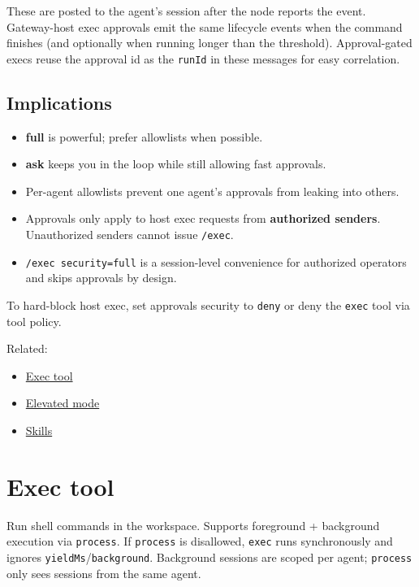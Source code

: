 These are posted to the agent’s session after the node reports the event.
Gateway-host exec approvals emit the same lifecycle events when the command finishes (and optionally when running longer than the threshold).
Approval-gated execs reuse the approval id as the \texttt{runId} in these messages for easy correlation.

\subsection{Implications}


\begin{itemize}
  \item \textbf{full} is powerful; prefer allowlists when possible.
  \item \textbf{ask} keeps you in the loop while still allowing fast approvals.
  \item Per-agent allowlists prevent one agent’s approvals from leaking into others.
  \item Approvals only apply to host exec requests from \textbf{authorized senders}. Unauthorized senders cannot issue \texttt{/exec}.
  \item \texttt{/exec security=full} is a session-level convenience for authorized operators and skips approvals by design.
\end{itemize}

To hard-block host exec, set approvals security to \texttt{deny} or deny the \texttt{exec} tool via tool policy.

Related:

\begin{itemize}
  \item \href{/tools/exec}{Exec tool}
  \item \href{/tools/elevated}{Elevated mode}
  \item \href{/tools/skills}{Skills}
\end{itemize}



\clearpage

\section{Exec tool}


Run shell commands in the workspace. Supports foreground + background execution via \texttt{process}.
If \texttt{process} is disallowed, \texttt{exec} runs synchronously and ignores \texttt{yieldMs}/\texttt{background}.
Background sessions are scoped per agent; \texttt{process} only sees sessions from the same agent.

